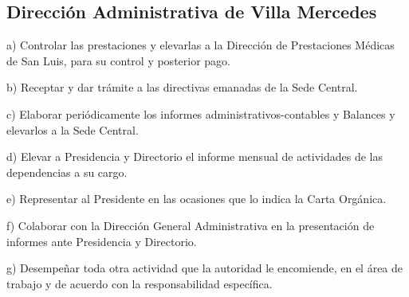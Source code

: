 \subsection{Dirección Administrativa de Villa Mercedes}
\begin{displayquote}
a) Controlar las prestaciones y elevarlas a la Dirección de Prestaciones Médicas de San Luis, para su control y posterior pago.

b) Receptar y dar trámite a las directivas emanadas de la Sede Central.

c) Elaborar periódicamente los informes administrativos-contables y Balances y elevarlos a la Sede Central.

d) Elevar a Presidencia y Directorio el informe mensual de actividades de las dependencias a su cargo.

e) Representar al Presidente en las ocasiones que lo indica la Carta Orgánica.

f) Colaborar con la Dirección General Administrativa en la presentación de informes ante Presidencia y Directorio.

g) Desempeñar toda otra actividad que la autoridad le encomiende, en el área de trabajo y de acuerdo con la responsabilidad específica.
\hfill\parencite{CSOrd17}
\end{displayquote}
